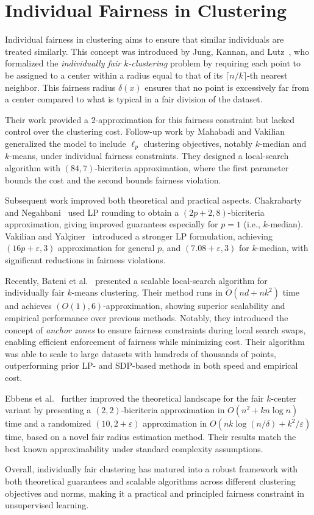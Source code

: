 \section{Individual Fairness in Clustering}
Individual fairness in clustering aims to ensure that similar individuals are treated similarly. This concept was introduced by Jung, Kannan, and Lutz~\cite{JungKL20}, who formalized the \emph{individually fair $k$-clustering} problem by requiring each point to be assigned to a center within a radius equal to that of its $\lceil n/k \rceil$-th nearest neighbor. This fairness radius $\delta(x)$ ensures that no point is excessively far from a center compared to what is typical in a fair division of the dataset.

Their work provided a $2$-approximation for this fairness constraint but lacked control over the clustering cost. Follow-up work by Mahabadi and Vakilian~\cite{MahabadiV20} generalized the model to include $\ell_p$ clustering objectives, notably $k$-median and $k$-means, under individual fairness constraints. They designed a local-search algorithm with $(84, 7)$-bicriteria approximation, where the first parameter bounds the cost and the second bounds fairness violation.

Subsequent work improved both theoretical and practical aspects. Chakrabarty and Negahbani~\cite{ChakrabartyN21} used LP rounding to obtain a $(2p+2, 8)$-bicriteria approximation, giving improved guarantees especially for $p = 1$ (i.e., $k$-median). Vakilian and Yalçiner~\cite{VakilianY22} introduced a stronger LP formulation, achieving $(16p+\varepsilon, 3)$ approximation for general $p$, and $(7.08 + \varepsilon, 3)$ for $k$-median, with significant reductions in fairness violations.

Recently, Bateni et al.~\cite{bateni2024scalable} presented a scalable local-search algorithm for individually fair $k$-means clustering. Their method runs in $\widetilde{O}(nd + nk^2)$ time and achieves $(O(1), 6)$-approximation, showing superior scalability and empirical performance over previous methods. Notably, they introduced the concept of \emph{anchor zones} to ensure fairness constraints during local search swaps, enabling efficient enforcement of fairness while minimizing cost. Their algorithm was able to scale to large datasets with hundreds of thousands of points, outperforming prior LP- and SDP-based methods in both speed and empirical cost.

Ebbens et al.~\cite{ebbens2024subquadratic} further improved the theoretical landscape for the fair $k$-center variant by presenting a $(2,2)$-bicriteria approximation in $O(n^2 + kn\log n)$ time and a randomized $(10, 2 + \varepsilon)$ approximation in $O(nk \log(n/\delta) + k^2/\varepsilon)$ time, based on a novel fair radius estimation method. Their results match the best known approximability under standard complexity assumptions.

Overall, individually fair clustering has matured into a robust framework with both theoretical guarantees and scalable algorithms across different clustering objectives and norms, making it a practical and principled fairness constraint in unsupervised learning.
